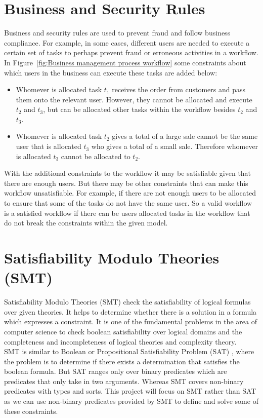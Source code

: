 \documentclass[a4paper]{report}
\begin{document}
\section{Business and Security Rules}
Business and security rules are used to prevent fraud and follow business compliance. For example, in some cases, different users are needed to execute a certain set of tasks to perhaps prevent fraud or erroneous activities in a workflow. In Figure~\ref{fig:Business management process workflow} some constraints about which users in the business can execute these tasks are added below:
\begin{itemize}
\item Whomever is allocated task $t_{1}$ receives the order from customers and pass them onto the relevant user. However, they cannot be allocated and execute $t_{2}$ and $t_{3}$, but can be allocated other tasks within the workflow besides $t_{2}$ and $t_{3}$.
\item Whomever is allocated task $t_{2}$ gives a total of a large sale cannot be the same user that is allocated $t_{3}$ who gives a total of a small sale. Therefore whomever is allocated $t_{3}$ cannot be allocated to $t_{2}$.
\end{itemize}

With the additional constraints to the workflow it may be satisfiable given that there are enough users. But there may be other constraints that can make this workflow unsatisfiable. For example, if there are not enough users to be allocated to ensure that some of the tasks do not have the same user. So a valid workflow is a satisfied workflow if there can be users allocated tasks in the workflow that do not break the constraints within the given model.\\

\section{Satisfiability Modulo Theories (SMT)}
Satisfiability Modulo Theories (SMT)\cite{smt_appetizer} check the satisfiability of logical formulas over given theories. It helps to determine whether there is a solution in a formula which expresses a constraint. It is one of the fundamental problems in the area of computer science to check boolean satisfiability over logical domains and the completeness and incompleteness of logical theories and complexity theory. \\

SMT is similar to Boolean or Propositional Satisfiability Problem (SAT)\cite{sat} , where the problem is to determine if there exists a determination that satisfies the boolean formula. But SAT ranges only over binary predicates which are predicates that only take in two arguments. Whereas SMT covers non-binary predicates with types and sorts. This project will focus on SMT rather than SAT as we can use non-binary predicates provided by SMT to define and solve some of these constraints. \\
\end{document}
